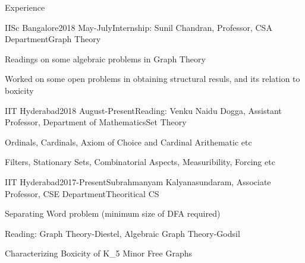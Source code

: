 \documentclass{resume} %
\begin{document}

\begin{rSection}{Experience}

\begin{rSubsection}{IISc Bangalore}{2018 May-July}{Internship: Sunil Chandran, Professor, CSA Department}{Graph Theory}
\item Readings on some algebraic problems in Graph Theory
\item Worked on some open problems in obtaining structural resuls, and its relation to boxicity

\end{rSubsection}

\begin{rSubsection}{IIT Hyderabad}{2018 August-Present}{Reading: Venku Naidu Dogga, Assistant Professor, Department of Mathematics}{Set Theory}
\item Ordinals, Cardinals, Axiom of Choice and Cardinal Arithematic etc
\item Filters, Stationary Sets, Combinatorial Aspects, Measuribility, Forcing etc

\end{rSubsection}


\begin{rSubsection}{IIT Hyderabad}{2017-Present}{Subrahmanyam Kalyanasundaram, Associate Professor, CSE Department}{Theoritical CS}
\item Separating Word problem (minimum size of DFA required)
\item Reading: Graph Theory-Diestel, Algebraic Graph Theory-Godsil
\item Characterizing Boxicity of K_5 Minor Free Graphs

\end{rSubsection}

\end{rSection}


\end{document}
